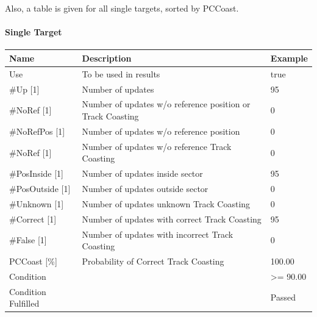 Also, a table is given for all single targets, sorted by PCCoast.

\paragraph{Single Target}

\begin{center}
 \begin{table}[H]
  \begin{tabularx}{\textwidth}{ | l | X |  l | }
    \hline
    \textbf{Name} & \textbf{Description} & \textbf{Example} \\ \hline
  Use & To be used in results & true \\ \hline
  \#Up [1] & Number of updates & 95 \\ \hline
  \#NoRef [1] & Number of updates w/o reference position or Track Coasting & 0 \\ \hline
  \#NoRefPos [1] & Number of updates w/o reference position  & 0 \\ \hline
  \#NoRef [1] & Number of updates w/o reference Track Coasting & 0 \\ \hline
  \#PosInside [1] & Number of updates inside sector & 95 \\ \hline
  \#PosOutside [1] & Number of updates outside sector & 0 \\ \hline
  \#Unknown [1] & Number of updates unknown Track Coasting & 0 \\ \hline
  \#Correct [1] & Number of updates with correct Track Coasting & 95 \\ \hline
  \#False [1] & Number of updates with incorrect Track Coasting & 0 \\ \hline
  PCCoast [\%] & Probability of Correct Track Coasting & 100.00 \\ \hline
  Condition &  & >= 90.00 \\ \hline
  Condition Fulfilled &  & Passed \\ \hline
\end{tabularx}
\end{table}
\end{center}
